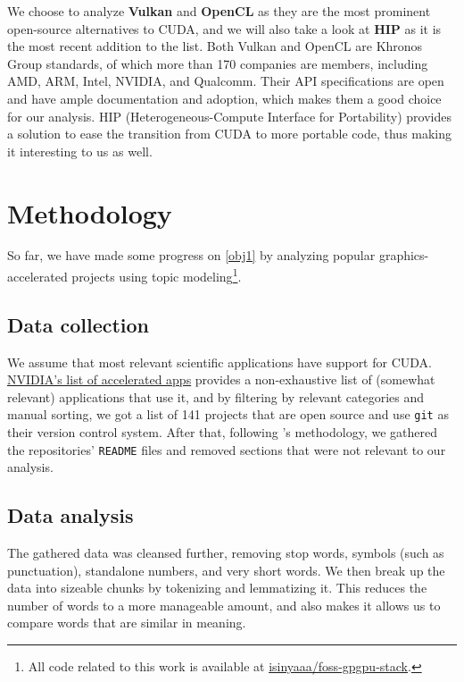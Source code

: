 \documentclass[12pt]{article}
\begin{document}
We choose to analyze \textbf{Vulkan} and \textbf{OpenCL} as they are the most
prominent open-source alternatives to CUDA, and we will also take a look at
\textbf{HIP} as it is the most recent addition to the list.
Both Vulkan and OpenCL are Khronos Group standards, of which more than 170
companies are members, including AMD, ARM, Intel, NVIDIA, and Qualcomm.
Their API specifications are open and have ample documentation and adoption,
which makes them a good choice for our analysis.
HIP (Heterogeneous-Compute Interface for Portability) provides a solution to
ease the transition from CUDA to more portable code, thus making it interesting
to us as well.

\section{Methodology} \label{sec:methodology}

So far, we have made some progress on \ref{obj1} by analyzing popular
graphics-accelerated projects using topic modeling\footnote{
    All code related to this work is available at \href{https://github.com/isinyaaa/foss-gpgpu-stack}{isinyaaa/foss-gpgpu-stack}.
}.

\subsection{Data collection} \label{sec:methodology:data-collection}

We assume that most relevant scientific applications have support for CUDA.
\href{https://nvidia.com/en-us/gpu-accelerated-applications}{NVIDIA's list of accelerated apps}
provides a non-exhaustive list of (somewhat relevant) applications that use
it, and by filtering by relevant categories and manual sorting, we got a list of 141 projects that
are open source and use \verb|git| as their version
control system.
After that, following \cite{zheng2018measuring}'s methodology, we gathered the
repositories' \verb|README| files and removed sections that were not relevant to
our analysis.

\subsection{Data analysis} \label{sec:methodology:data-analysis}

The gathered data was cleansed further, removing stop words, symbols (such as
punctuation), standalone numbers, and very short words.
We then break up the data into sizeable chunks by tokenizing and lemmatizing
it.
This reduces the number of words to a more
manageable amount, and also makes it allows us to compare words that are similar
in meaning.
\end{document}

